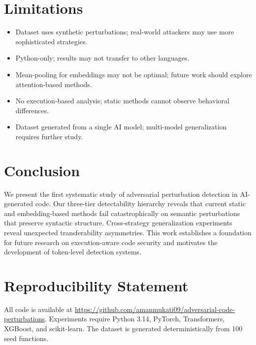 \documentclass[11pt]{article}
\begin{document}
\section{Limitations}

\begin{itemize}
    \item Dataset uses synthetic perturbations; real-world attackers may use more sophisticated strategies.
    \item Python-only; results may not transfer to other languages.
    \item Mean-pooling for embeddings may not be optimal; future work should explore attention-based methods.
    \item No execution-based analysis; static methods cannot observe behavioral differences.
    \item Dataset generated from a single AI model; multi-model generalization requires further study.
\end{itemize}

\section{Conclusion}

We present the first systematic study of adversarial perturbation detection in AI-generated code. Our three-tier detectability hierarchy reveals that current static and embedding-based methods fail catastrophically on semantic perturbations that preserve syntactic structure. Cross-strategy generalization experiments reveal unexpected transferability asymmetries. This work establishes a foundation for future research on execution-aware code security and motivates the development of token-level detection systems.

\section*{Reproducibility Statement}

All code is available at \url{https://github.com/amanmukati09/adversarial-code-perturbations}. Experiments require Python 3.14, PyTorch, Transformers, XGBoost, and scikit-learn. The dataset is generated deterministically from 100 seed functions.
\end{document}
